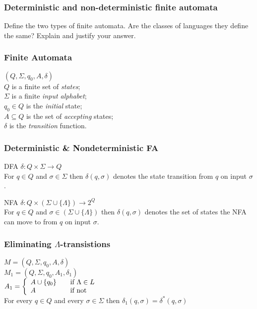 

\begin{frame}
    \frametitle{Deterministic and non-deterministic finite automata}
    Define the two types of finite automata. Are the classes of languages they
    define the same? Explain and justify your answer.
\end{frame}

\begin{frame}
    \frametitle{Finite Automata}
    $(Q,\Sigma,q_0, A,\delta)$\\
    $Q$ is a finite set of \emph{states};\\
    $\Sigma$ is a finite \emph{input alphabet};\\
    $q_0 \in Q$ is the \emph{initial} state;\\
    $A \subseteq Q$ is the set of \emph{accepting} states;\\
    $\delta$ is the \emph{transition} function.
\end{frame}

\begin{frame}
    \frametitle{Deterministic \& Nondeterministic FA}
    \begin{block}{DFA}
        $\delta : Q \times \Sigma \rightarrow Q$\\
        For $q \in Q$ and $\sigma \in \Sigma$ then $\delta(q, \sigma)$ denotes
        the state transition from $q$ on input $\sigma$.
    \end{block}

    \begin{block}{NFA}
        $\delta : Q \times (\Sigma \cup \{\Lambda\}) \rightarrow 2^Q$\\
        For $q \in Q$ and $\sigma \in (\Sigma \cup \{\Lambda\})$ then
        $\delta(q, \sigma)$ denotes the set of states the NFA can move to from
        $q$ on input $\sigma$.
    \end{block}
\end{frame}

\begin{frame}
    \frametitle{Eliminating $\Lambda$-transistions}
    $M = (Q,\Sigma,q_0,A,\delta)$\\
    $M_1 = (Q,\Sigma,q_0,A_1,\delta_1)$\\
    \pause
    $ A_1 = \left\{
        \begin{array}{l l}
            A \cup \{q_0\} & \quad \text{if $\Lambda \in L$ }\\
            A & \quad \text{if not}
    \end{array} \right.$\\
    \pause
    For every $q \in Q$ and every $\sigma \in \Sigma$ then $\delta_1(q,\sigma)
    = \delta^\ast(q,\sigma)$\\
\end{frame}

